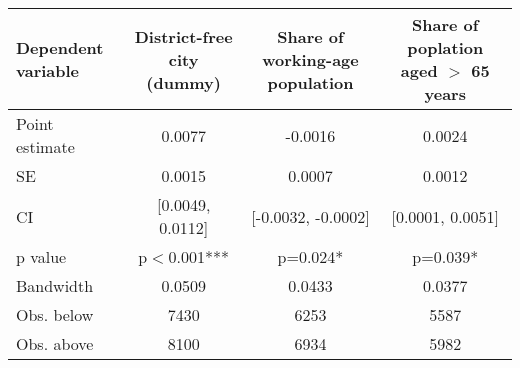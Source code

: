 \begin{tabular}{lccc}
  \toprule
 \midrule
Dependent variable & District-free city (dummy) & Share of working-age population & Share of poplation aged $>$ 65 years \\ 
  \midrule
Point estimate &   0.0077 &  -0.0016 &   0.0024 \\ 
  SE &  0.0015 &  0.0007 &  0.0012 \\ 
  CI & [0.0049, 0.0112] & [-0.0032, -0.0002] & [0.0001, 0.0051] \\ 
  p value & p$<$0.001*** & p=0.024* & p=0.039* \\ 
   \midrule
Bandwidth & 0.0509 & 0.0433 & 0.0377 \\ 
  Obs. below &  7430 &  6253 &  5587 \\ 
  Obs. above &  8100 &  6934 &  5982 \\ 
   \midrule
 \bottomrule
\end{tabular}
